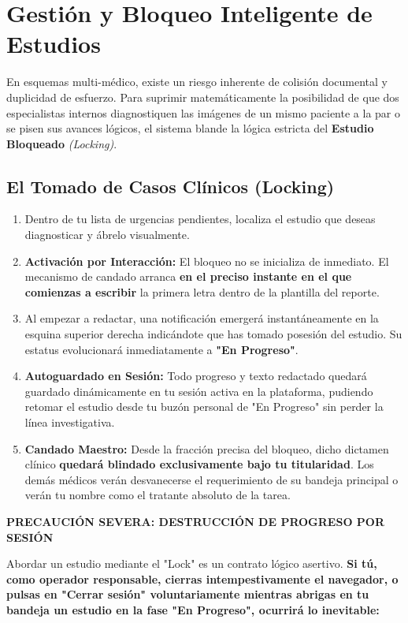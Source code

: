 \section{Gestión y Bloqueo Inteligente de Estudios}

En esquemas multi-médico, existe un riesgo inherente de colisión documental y duplicidad de esfuerzo. Para suprimir matemáticamente la posibilidad de que dos especialistas internos diagnostiquen las imágenes de un mismo paciente a la par o se pisen sus avances lógicos, el sistema blande la lógica estricta del \textbf{Estudio Bloqueado} \textit{(Locking)}.

\subsection{El Tomado de Casos Clínicos (Locking)}

\begin{enumerate}
    \item Dentro de tu lista de urgencias pendientes, localiza el estudio que deseas diagnosticar y ábrelo visualmente.
    \item \textbf{Activación por Interacción:} El bloqueo no se inicializa de inmediato. El mecanismo de candado arranca \textbf{en el preciso instante en el que comienzas a escribir} la primera letra dentro de la plantilla del reporte.
    \item Al empezar a redactar, una notificación emergerá instantáneamente en la esquina superior derecha indicándote que has tomado posesión del estudio. Su estatus evolucionará inmediatamente a \textbf{"En Progreso"}.
    \item \textbf{Autoguardado en Sesión:} Todo progreso y texto redactado quedará guardado dinámicamente en tu sesión activa en la plataforma, pudiendo retomar el estudio desde tu buzón personal de "En Progreso" sin perder la línea investigativa.
    \item \textbf{Candado Maestro:} Desde la fracción precisa del bloqueo, dicho dictamen clínico \textbf{quedará blindado exclusivamente bajo tu titularidad}. Los demás médicos verán desvanecerse el requerimiento de su bandeja principal o verán tu nombre como el tratante absoluto de la tarea.
\end{enumerate}

\textbf{PRECAUCIÓN SEVERA: DESTRUCCIÓN DE PROGRESO POR SESIÓN}

Abordar un estudio mediante el "Lock" es un contrato lógico asertivo. \textbf{Si tú, como operador responsable, cierras intempestivamente el navegador, o pulsas en "Cerrar sesión" voluntariamente mientras abrigas en tu bandeja un estudio en la fase "En Progreso", ocurrirá lo inevitable:}

